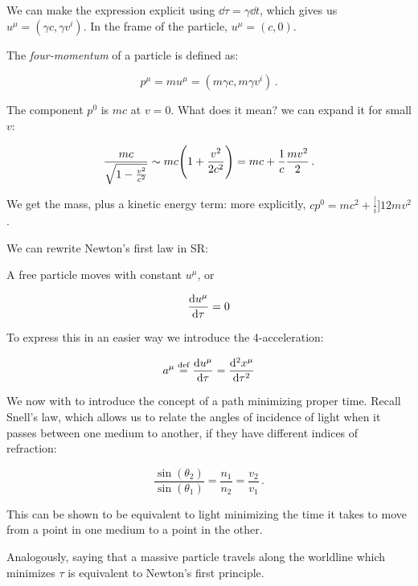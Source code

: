 \documentclass[main.tex]{subfiles}
\begin{document}
We can make the expression explicit using \(\dd{\tau} = \gamma \dd{t}\), which gives us \(u^{\mu} = (\gamma c, \gamma v^{i})\).
In the frame of the particle, \(u^{\mu} = (c, 0)\).   

The \emph{four-momentum} of a particle is defined as: 

\begin{equation}
  p^{\mu} = m u^{\mu} = (m \gamma c, m \gamma v^{i})\,.
\end{equation}

The component \(p^{0}\) is \(mc\) at \(v=0\). What does it mean? we can expand it for small \(v\):

\begin{equation}
  \frac{mc}{\sqrt{1 - \frac{v^{2}}{c^{2}}}} \sim
  mc \qty(1 + \frac{v^{2}}{2 c^{2} } )
  = mc + \frac{1}{c} \frac{mv^{2}}{2}\,.
\end{equation}

We get the mass, plus a kinetic energy term: more explicitly, \(cp^0 = mc^{2} + \frac[i]{1}{2} m v^{2}\).

We can rewrite Newton's first law in SR:

\begin{proposition}[Newton I]
A free particle moves with constant \(u^{\mu}\), or 

\begin{equation}
  \dv{u^{\mu}}{\tau} = 0 
\end{equation}
\end{proposition}

To express this in an easier way we introduce the 4-acceleration:

\begin{equation}
  a^{\mu} \stackrel{\text{def}}{=} \dv{u^{\mu}}{\tau} = \dv[2]{x^{\mu}}{\tau}
\end{equation}

We now with to introduce the concept of a path minimizing proper time. Recall Snell's law, which allows us to relate the angles of incidence of light when it passes between one medium to another, if they have different indices of refraction:

\begin{equation}
  \frac{\sin(\theta_{2})}{\sin(\theta_{1})} = \frac{n_1}{n_2 } = \frac{v_2}{v_1 }\,.
\end{equation}

This can be shown to be equivalent to light minimizing the time it takes to move from a point in one medium to a point in the other.

Analogously, saying that a massive particle travels along the worldline which minimizes \(\tau\) is equivalent to Newton's first principle.
\end{document}
